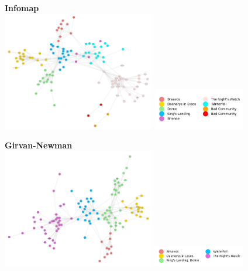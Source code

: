 \documentclass[10pt,twocolumn,letterpaper]{article}
\begin{document}
\begin{center}
    \textbf{Infomap}  \\

    \includegraphics[width=0.5\textwidth]{img/s5/communities_infomap.jpg}
    \includegraphics[width=0.3\textwidth]{img/s5/infomap_legend.jpg}\\
    \caption{\small{$\#communities=9$, $modularity=0.661$}}
\end{center}




\begin{center}
    \textbf{Girvan-Newman} \\
    \includegraphics[width=0.5\textwidth]{img/s5/communities_g-n.jpg}
    \includegraphics[width=0.3\textwidth]{img/s5/g-n_legend.jpg}\\
    \caption{\small{$\#communities=5$, $modularity=0.637$}}
\end{center}
\end{document}
